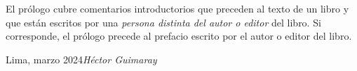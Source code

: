 %
%

\foreword

El prólogo cubre comentarios introductorios que preceden al texto de un libro
y que están escritos por una \textit{persona distinta del autor o editor} del libro.
Si corresponde, el prólogo precede al prefacio escrito por el autor o editor del libro.

\vspace{\baselineskip}
\begin{flushright}\noindent
    Lima, marzo 2024\hfill {\it Héctor  Guimaray}
\end{flushright}